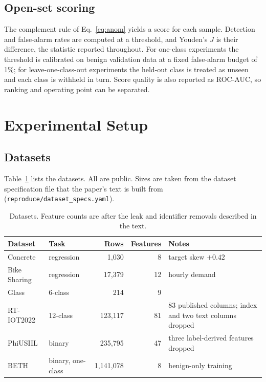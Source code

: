 \documentclass[journal]{IEEEtran}
\begin{document}
\subsection{Open-set scoring}
The complement rule of Eq.~\eqref{eq:anom} yields a score for each sample. Detection and false-alarm rates are computed at a threshold, and Youden's $J$ is their difference, the statistic reported throughout. For one-class experiments the threshold is calibrated on benign validation data at a fixed false-alarm budget of 1\%; for leave-one-class-out experiments the held-out class is treated as unseen and each class is withheld in turn. Score quality is also reported as ROC-AUC, so ranking and operating point can be separated.

\section{Experimental Setup}
\label{sec:setup}

\subsection{Datasets}
Table~\ref{tab:datasets} lists the datasets. All are public. Sizes are taken from the dataset specification file that the paper's text is built from (\texttt{reproduce/dataset\_specs.yaml}).

\begin{table}[t]
\centering
\caption{Datasets. Feature counts are after the leak and identifier removals described in the text.}
\label{tab:datasets}
\begin{tabular}{llrrl}
\toprule
Dataset & Task & Rows & Features & Notes \\
\midrule
Concrete \cite{yeh1998modeling} & regression & 1{,}030 & 8 & target skew $+0.42$ \\
Bike Sharing & regression & 17{,}379 & 12 & hourly demand \\
Glass & 6-class & 214 & 9 & \\
RT-IOT2022 & 12-class & 123{,}117 & 81 & 83 published columns; index and two text columns dropped \\
PhiUSIIL & binary & 235{,}795 & 47 & three label-derived features dropped \\
BETH & binary, one-class & 1{,}141{,}078 & 8 & benign-only training \\
\bottomrule
\end{tabular}
\end{table}
\end{document}
